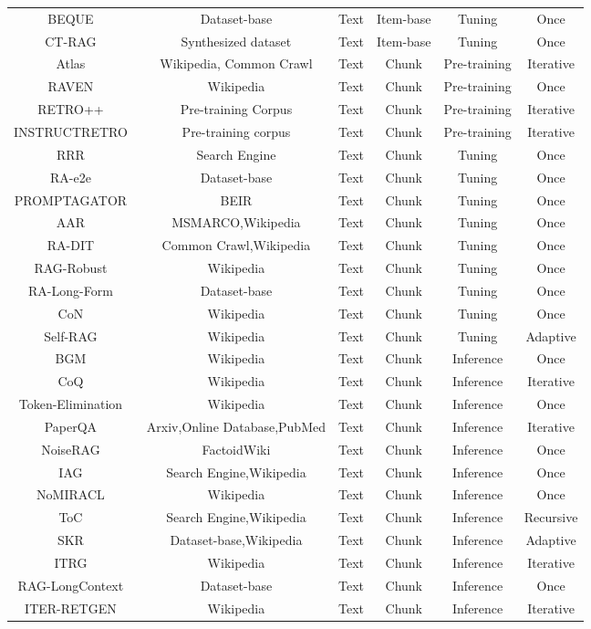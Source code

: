 \begin{table}
{\begin{tabular}{cccccc}
BEQUE~& Dataset-base& Text& Item-base& Tuning&Once\\
CT-RAG~& Synthesized dataset& Text& Item-base& Tuning&Once\\
Atlas~&   Wikipedia, Common Crawl&Text&  Chunk&  Pre-training&Iterative\\ 
RAVEN~& Wikipedia& Text& Chunk& Pre-training&Once\\
RETRO++~& Pre-training Corpus& Text& Chunk& Pre-training&Iterative\\
INSTRUCTRETRO~&Pre-training corpus& Text& Chunk & Pre-training&Iterative\\
RRR~& Search Engine& Text& Chunk& Tuning&Once\\
RA-e2e~& Dataset-base& Text& Chunk& Tuning&Once\\
PROMPTAGATOR~& BEIR&Text&  Chunk&  Tuning&Once\\
AAR~& MSMARCO,Wikipedia& Text& Chunk& Tuning&Once\\
RA-DIT~& Common Crawl,Wikipedia& Text& Chunk& Tuning&Once\\
RAG-Robust~& Wikipedia& Text& Chunk& Tuning&Once\\
RA-Long-Form~ & Dataset-base& Text& Chunk& Tuning&Once\\
CoN~& Wikipedia& Text& Chunk& Tuning&Once\\
Self-RAG~& Wikipedia& Text& Chunk& Tuning&Adaptive\\
BGM~& Wikipedia&Text & Chunk& Inference&Once\\
CoQ~& Wikipedia& Text& Chunk& Inference&Iterative\\
Token-Elimination~& Wikipedia& Text& Chunk& Inference&Once\\
PaperQA~& Arxiv,Online Database,PubMed& Text& Chunk& Inference&Iterative\\
NoiseRAG~& FactoidWiki& Text& Chunk& Inference&Once\\
IAG~& Search Engine,Wikipedia& Text& Chunk& Inference&Once\\
NoMIRACL~& Wikipedia& Text& Chunk& Inference&Once\\
ToC~& Search Engine,Wikipedia& Text& Chunk& Inference&Recursive\\
SKR~& Dataset-base,Wikipedia& Text& Chunk& Inference&Adaptive\\
ITRG~& Wikipedia& Text& Chunk& Inference&Iterative\\
RAG-LongContext~& Dataset-base& Text& Chunk& Inference&Once\\
ITER-RETGEN~& Wikipedia& Text& Chunk& Inference&Iterative\\

\end{tabular}}
\end{table}
